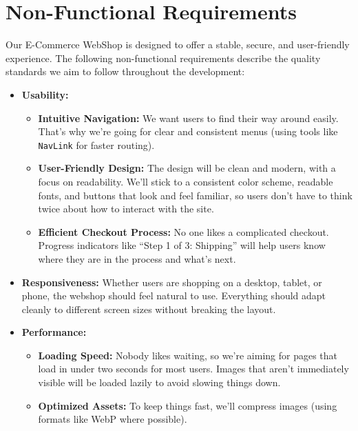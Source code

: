 \documentclass[a4paper,12pt]{article}
\begin{document}
	\section{Non-Functional Requirements}

Our E-Commerce WebShop is designed to offer a stable, secure, and user-friendly experience. The following non-functional requirements describe the quality standards we aim to follow throughout the development:

\begin{itemize}
    \item \textbf{Usability:}  
    \begin{itemize}
        \item \textbf{Intuitive Navigation:}  
        We want users to find their way around easily. That’s why we’re going for clear and consistent menus (using tools like \texttt{NavLink} for faster routing).

        \item \textbf{User-Friendly Design:}  
        The design will be clean and modern, with a focus on readability. We’ll stick to a consistent color scheme, readable fonts, and buttons that look and feel familiar, so users don’t have to think twice about how to interact with the site.

        \item \textbf{Efficient Checkout Process:}  
        No one likes a complicated checkout. Progress indicators like “Step 1 of 3: Shipping” will help users know where they are in the process and what’s next.
    \end{itemize}

    \item \textbf{Responsiveness:}  
    Whether users are shopping on a desktop, tablet, or phone, the webshop should feel natural to use. Everything should adapt cleanly to different screen sizes without breaking the layout.

    \item \textbf{Performance:}  
    \begin{itemize}
        \item \textbf{Loading Speed:}  
        Nobody likes waiting, so we’re aiming for pages that load in under two seconds for most users. Images that aren’t immediately visible will be loaded lazily to avoid slowing things down.

        \item \textbf{Optimized Assets:}  
        To keep things fast, we’ll compress images (using formats like WebP where possible).


\end{itemize}
\end{itemize}
\end{document}
